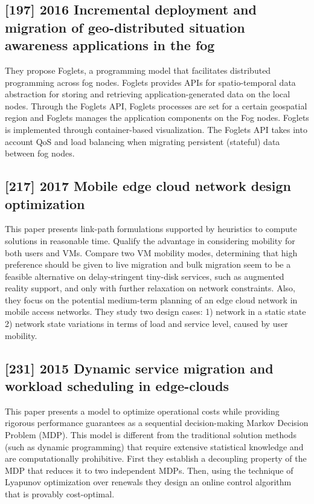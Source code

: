 \subsection{[197] 2016 Incremental deployment and migration of geo-distributed situation awareness applications in the fog}
\label{subsec:paper07} \cite{saurez2016incremental}
They propose Foglets, a programming model that facilitates distributed programming across fog nodes. Foglets provides APIs for spatio-temporal data abstraction for storing and retrieving application-generated data on the local nodes. Through the Foglets API, Foglets processes are set for a certain geospatial region and Foglets manages the application components on the Fog nodes. Foglets is implemented through container-based visualization. The Foglets API takes into account QoS and load balancing when migrating persistent (stateful) data between fog nodes.

\subsection{[217] 2017 Mobile edge cloud network design optimization}
\label{subsec:paper08} \cite{ceselli2017mobile}
This paper presents link-path formulations supported by heuristics to compute solutions in reasonable time. Qualify the advantage in considering mobility for both users and VMs. Compare two VM mobility modes, determining that high preference should be given to live migration and bulk migration seem to be a feasible alternative on delay-stringent tiny-disk services, such as augmented reality support, and only with further relaxation on network constraints. Also, they focus on the potential medium-term planning of an edge cloud network in mobile access networks. They study two design cases: 1) network in a static state 2) network state variations in terms of load and service level, caused by user mobility.

\subsection{[231] 2015 Dynamic service migration and workload scheduling in edge-clouds}
\label{subsec:paper09} \cite{urgaonkar2015dynamic}
This paper presents a model to optimize operational costs while providing rigorous performance guarantees as a sequential decision-making Markov Decision Problem (MDP). This model is different from the traditional solution methods (such as dynamic programming) that require extensive statistical knowledge and are computationally prohibitive. First they establish a decoupling property of the MDP that reduces it to two independent MDPs. Then, using the technique of Lyapunov optimization over renewals they design an online control algorithm that is provably cost-optimal.

